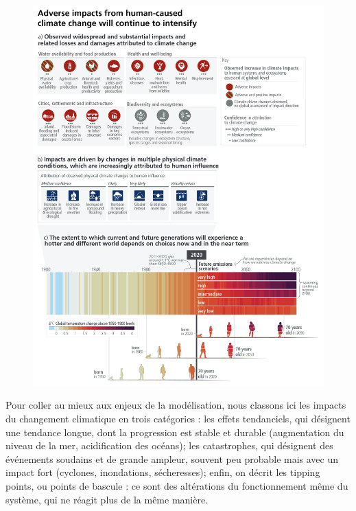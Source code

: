 \begin{figure}
    \centering
    \includegraphics[width=\textwidth]{figures/spm1.png}
    \label{fig:ipcc-impacts}
\end{figure}

Pour coller au mieux aux enjeux de la modélisation, nous classons ici les impacts du changement climatique en trois catégories : les effets tendanciels, qui désignent une tendance longue, dont la progression est stable et durable (augmentation du niveau de la mer, acidification des océans); les catastrophes, qui désignent des événements soudains et de grande ampleur, souvent peu probable mais avec un impact fort (cyclones, inondations, sécheresses); enfin, on décrit les \glspl{tipping point}, ou points de bascule : ce sont des altérations du fonctionnement même du système, qui ne réagit plus de la même manière. 

